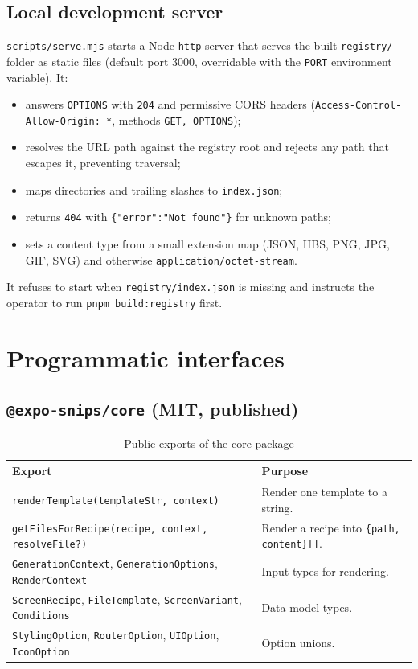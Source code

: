 \subsection*{Local development server}

\texttt{scripts/serve.mjs} starts a Node \texttt{http} server that serves the built
\texttt{registry/} folder as static files (default port 3000, overridable with the
\texttt{PORT} environment variable). It:

\begin{itemize}
  \item answers \texttt{OPTIONS} with \texttt{204} and permissive CORS headers
        (\texttt{Access-Control-Allow-Origin: *}, methods \texttt{GET, OPTIONS});
  \item resolves the URL path against the registry root and rejects any path that
        escapes it, preventing traversal;
  \item maps directories and trailing slashes to \texttt{index.json};
  \item returns \texttt{404} with \texttt{\{"error":"Not found"\}} for unknown paths;
  \item sets a content type from a small extension map (JSON, HBS, PNG, JPG, GIF,
        SVG) and otherwise \texttt{application/octet-stream}.
\end{itemize}

It refuses to start when \texttt{registry/index.json} is missing and instructs the
operator to run \texttt{pnpm build:registry} first.

\section{Programmatic interfaces}

\subsection*{\texttt{@expo-snips/core} (MIT, published)}

\begin{longtable}{p{6.4cm}p{7.8cm}}
\caption{Public exports of the core package}\\
\toprule
\textbf{Export} & \textbf{Purpose} \\
\midrule

\texttt{renderTemplate(templateStr, context)} & Render one template to a string. \\
\texttt{getFilesForRecipe(recipe, context, resolveFile?)} & Render a recipe into
\texttt{\{path, content\}[]}. \\
\texttt{GenerationContext}, \texttt{GenerationOptions}, \texttt{RenderContext} & Input
types for rendering. \\
\texttt{ScreenRecipe}, \texttt{FileTemplate}, \texttt{ScreenVariant},
\texttt{Conditions} & Data model types. \\
\texttt{StylingOption}, \texttt{RouterOption}, \texttt{UIOption}, \texttt{IconOption} &
Option unions. \\
\bottomrule
\end{longtable}

